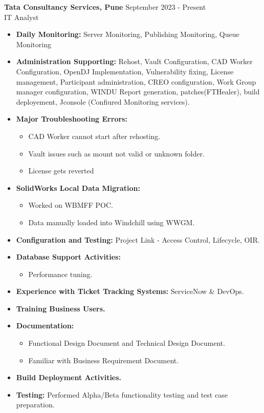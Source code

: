 \documentclass[letterpaper]{twentysecondcv} %
\begin{document}
\begin{twenty} %
\end{twenty}
\textbf{Tata Consultancy Services, Pune} \hfill September 2023 - Present  
\\[+2pt] IT Analyst  
\begin{itemize}
    \item \textbf{Daily Monitoring:} Server Monitoring, Publishing Monitoring, Queue Monitoring
    \item \textbf{Administration Supporting:} Rehost, Vault Configuration, CAD Worker Configuration, OpenDJ Implementation, Vulnerability fixing, License management, Participant administration, CREO configuration, Work Group manager configuration, WINDU Report generation, patches(FTHealer), build deployement, Jconsole (Confiured Monitoring services).
    \item \textbf{Major Troubleshooting Errors:} 
    \begin{itemize}
        \item CAD Worker cannot start after rehosting.
        \item Vault issues such as mount not valid or unknown folder.
        \item License gets reverted
    \end{itemize}
    \item \textbf{SolidWorks Local Data Migration:} 
    \begin{itemize}
        \item Worked on WBMFF POC.
        \item Data manually loaded into Windchill using WWGM.
    \end{itemize}
    \item \textbf{Configuration and Testing:} Project Link - Access Control, Lifecycle, OIR.
    \item \textbf{Database Support Activities:} 
    \begin{itemize}
        \item Performance tuning.
    \end{itemize}
    \item \textbf{Experience with Ticket Tracking Systems:} ServiceNow & DevOps.
    \item \textbf{Training Business Users.}
    \item \textbf{Documentation:} 
    \begin{itemize}
        \item Functional Design Document and Technical Design Document.
        \item Familiar with Business Requirement Document.
    \end{itemize}
    \item \textbf{Build Deployment Activities.}
    \item \textbf{Testing:} Performed Alpha/Beta functionality testing and test case preparation.
\end{itemize}
\end{document}
